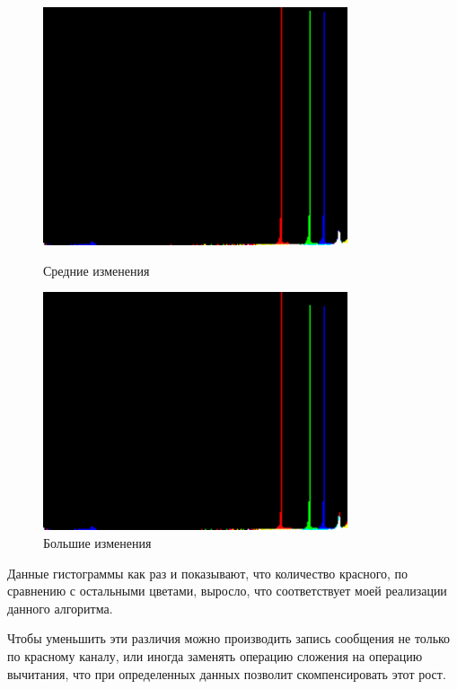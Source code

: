 \documentclass[a4paper]{article}
\begin{document}
  \begin{figure}[H]
    \centering
    \begin{minipage}[t]{0.4\textwidth}
        \centering
        \includegraphics[width=0.8\textwidth]{hist_2}
        \caption{Средние изменения}
    \end{minipage}
    \hfill
    \begin{minipage}[t]{0.4\textwidth}
        \centering
        \includegraphics[width=0.8\textwidth]{hist_3}
        \caption{Большие изменения} 
    \end{minipage}
  \end{figure}

  Данные гистограммы как раз и показывают, что количество красного, по сравнению
  с остальными цветами, выросло, что соответствует моей реализации данного алгоритма.

  Чтобы уменьшить эти различия можно производить запись сообщения не только
  по красному каналу, или иногда заменять операцию сложения на операцию вычитания,
  что при определенных данных позволит скомпенсировать этот рост.
\end{document}
